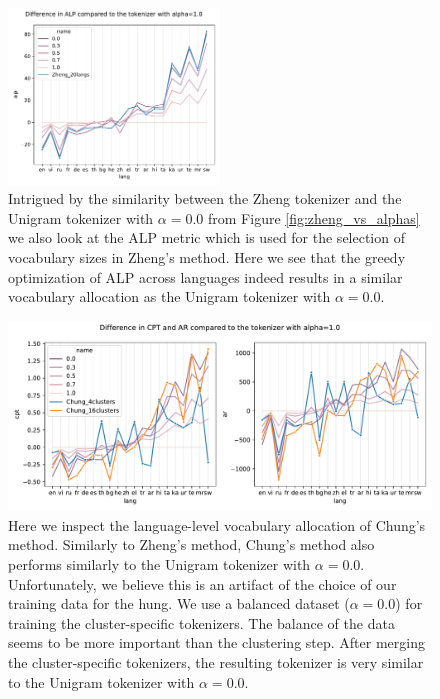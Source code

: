 \begin{figure}
    \centering
    \includegraphics[width=0.5\textwidth]{figures/zheng_vs_alphas_alp.pdf}
    \caption{Intrigued by the similarity between the Zheng tokenizer and the Unigram tokenizer with $\alpha=0.0$ from Figure \ref{fig:zheng_vs_alphas} we also look at the ALP metric which is used for the selection of vocabulary sizes in Zheng's method. Here we see that the greedy optimization of ALP across languages indeed results in a similar vocabulary allocation as the Unigram tokenizer with $\alpha=0.0$.}
    \label{fig:zheng_vs_alphas_alp}
\end{figure}

\begin{figure}
    \centering
    \includegraphics[width=\textwidth]{figures/chung_vs_alphas.pdf}
    \caption{Here we inspect the language-level vocabulary allocation of Chung's method. Similarly to Zheng's method, Chung's method also performs similarly to the Unigram tokenizer with $\alpha=0.0$. Unfortunately, we believe this is an artifact of the choice of our training data for the hung. We use a balanced dataset ($\alpha=0.0$) for training the cluster-specific tokenizers. The balance of the data seems to be more important than the clustering step. After merging the cluster-specific tokenizers, the resulting tokenizer is very similar to the Unigram tokenizer with $\alpha=0.0$.}
    \label{fig:chung_vs_alphas}
\end{figure}

